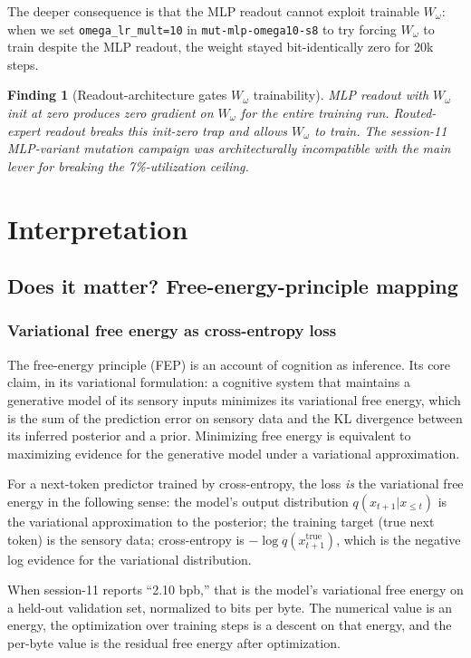 \documentclass[11pt,openany]{book}
\newtheorem{finding}{Finding}[chapter]
\begin{document}
The deeper consequence is that the MLP readout cannot exploit
trainable $W_\omega$: when we set \texttt{omega\_lr\_mult=10} in
\texttt{mut-mlp-omega10-s8} to try forcing $W_\omega$ to train
despite the MLP readout, the weight stayed bit-identically zero for
20k steps.

\begin{finding}[Readout-architecture gates $W_\omega$ trainability]
MLP readout with $W_\omega$ init at zero produces zero gradient on
$W_\omega$ for the entire training run. Routed-expert readout
breaks this init-zero trap and allows $W_\omega$ to train. The
session-11 MLP-variant mutation campaign was architecturally
incompatible with the main lever for breaking the 7\%-utilization
ceiling.
\end{finding}

\part{Interpretation}

\chapter{Does it matter? Free-energy-principle mapping}

\section{Variational free energy as cross-entropy loss}

The free-energy principle (FEP) is an account of cognition as
inference. Its core claim, in its variational formulation: a cognitive
system that maintains a generative model of its sensory inputs
minimizes its variational free energy, which is the sum of the
prediction error on sensory data and the KL divergence between its
inferred posterior and a prior. Minimizing free energy is equivalent
to maximizing evidence for the generative model under a variational
approximation.

For a next-token predictor trained by cross-entropy, the loss
\emph{is} the variational free energy in the following sense: the
model's output distribution $q(x_{t+1} | x_{\leq t})$ is the
variational approximation to the posterior; the training target
(true next token) is the sensory data; cross-entropy is
$-\log q(x_{t+1}^{\text{true}})$, which is the negative log evidence
for the variational distribution.

When session-11 reports ``2.10 bpb,'' that is the model's
variational free energy on a held-out validation set, normalized to
bits per byte. The numerical value is an energy, the optimization
over training steps is a descent on that energy, and the per-byte
value is the residual free energy after optimization.
\end{document}

